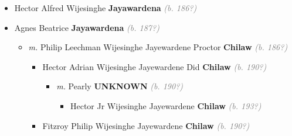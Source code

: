 \documentclass[10pt, openany]{book}
\begin{document}
\begin{itemize}
{\begin{itemize}
{\begin{itemize}
{\begin{itemize}
{\begin{itemize}
{\begin{itemize}
{\begin{itemize}
\item{\textit{m.} Lalith Athulathmudali Lalith William Samarasekera Athulathmudali MP Minister Sri Lanka \textbf{Government} \textcolor{gray}{\textit{(b. 193?)}}   \label{couple:00003527:00003528} \begin{itemize}
\item{Serala Athulathmudali \textbf{Government} \textcolor{gray}{\textit{(b. 196?)}}
  }
\end{itemize}}
\end{itemize}
        }
\end{itemize}}
\end{itemize}
      }
\end{itemize}}
\end{itemize}
  }
\item{Hector Alfred Wijesinghe \textbf{Jayawardena} \textcolor{gray}{\textit{(b. 186?)}}
   }
\item{Agnes Beatrice \textbf{Jayawardena} \textcolor{gray}{\textit{(b. 187?)}}
\begin{itemize}
\item{\textit{m.} Philip Leechman Wijesinghe Jayewardene Proctor \textbf{Chilaw} \textcolor{gray}{\textit{(b. 186?)}}   \label{couple:00003506:00003507} \begin{itemize}
\item{Hector Adrian Wijesinghe Jayewardene Did \textbf{Chilaw} \textcolor{gray}{\textit{(b. 190?)}}
\begin{itemize}
\item{\textit{m.} Pearly \textbf{UNKNOWN} \textcolor{gray}{\textit{(b. 190?)}}   \label{couple:00003508:00003509} \begin{itemize}
\item{Hector Jr Wijesinghe Jayewardene \textbf{Chilaw} \textcolor{gray}{\textit{(b. 193?)}}
    }
\end{itemize}}
\end{itemize}
     }
\item{Fitzroy Philip Wijesinghe Jayewardene \textbf{Chilaw} \textcolor{gray}{\textit{(b. 190?)}}
}
\end{itemize}}
\end{itemize}}
\end{itemize}}
\end{itemize}
\end{document}
